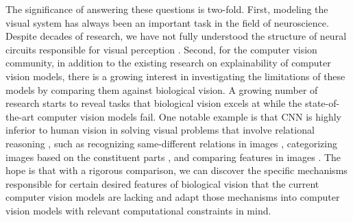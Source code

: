 \par The significance of answering these questions is two-fold. First, modeling the visual system has always been an important task in the field of neuroscience. Despite decades of research, we have not fully understood the structure of neural circuits responsible for visual perception \cite{Gwilliams221630}. Second, for the computer vision community, in addition to the existing research on explainability of computer vision models, there is a growing interest in investigating the limitations of these models by comparing them against biological vision. A growing number of research starts to reveal tasks that biological vision excels at while the state-of-the-art computer vision models fail. One notable example is that CNN is highly inferior to human vision in solving visual problems that involve relational reasoning \cite{glorot-bengio-difficulty}, such as recognizing same-different relations in images \cite{ricci_same-different_2018}, categorizing images based on the constituent parts \cite{visual-categorization}, and comparing features in images  \cite{cnn-human-abstraction}. The hope is that with a rigorous comparison, we can discover the specific mechanisms responsible for certain desired features of biological vision that the current computer vision models are lacking and adapt those mechanisms into computer vision models with relevant computational constraints in mind.


